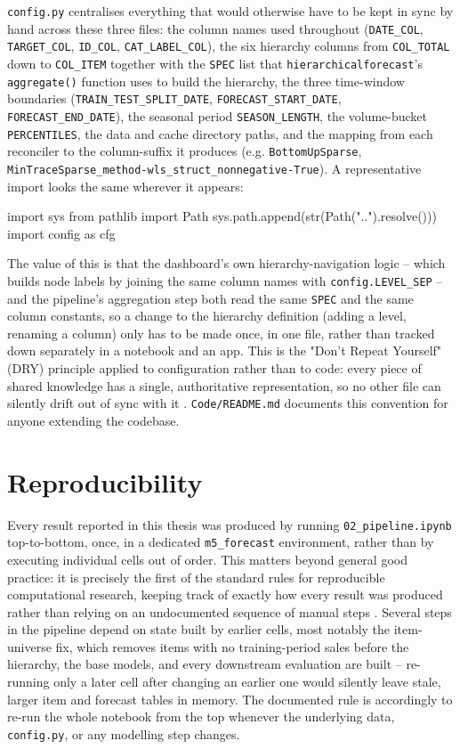 \texttt{config.py} centralises everything that would otherwise have to be kept in sync by hand across these three files: the column names used throughout (\texttt{DATE\_COL}, \texttt{TARGET\_COL}, \texttt{ID\_COL}, \texttt{CAT\_LABEL\_COL}), the six hierarchy columns from \texttt{COL\_TOTAL} down to \texttt{COL\_ITEM} together with the \texttt{SPEC} list that \texttt{hierarchicalforecast}'s \texttt{aggregate()} function uses to build the hierarchy, the three time-window boundaries (\texttt{TRAIN\_TEST\_SPLIT\_DATE}, \texttt{FORECAST\_START\_DATE}, \texttt{FORECAST\_END\_DATE}), the seasonal period \texttt{SEASON\_LENGTH}, the volume-bucket \texttt{PERCENTILES}, the data and cache directory paths, and the mapping from each reconciler to the column-suffix it produces (e.g. \texttt{BottomUpSparse}, \texttt{MinTraceSparse\_method-wls\_struct\_nonnegative-True}). A representative import looks the same wherever it appears:

\begin{Python}
	import sys
	from pathlib import Path
	sys.path.append(str(Path("..").resolve()))
	import config as cfg
\end{Python}

The value of this is that the dashboard's own hierarchy-navigation logic -- which builds node labels by joining the same column names with \texttt{config.LEVEL\_SEP} -- and the pipeline's aggregation step both read the same \texttt{SPEC} and the same column constants, so a change to the hierarchy definition (adding a level, renaming a column) only has to be made once, in one file, rather than tracked down separately in a notebook and an app. This is the "Don't Repeat Yourself" (DRY) principle applied to configuration rather than to code: every piece of shared knowledge has a single, authoritative representation, so no other file can silently drift out of sync with it \cite{Hunt:1999}. \texttt{Code/README.md} documents this convention for anyone extending the codebase.

\section{Reproducibility}
\label{sec:reproducibility}

Every result reported in this thesis was produced by running \texttt{02\_pipeline.ipynb} top-to-bottom, once, in a dedicated \texttt{m5\_forecast} environment, rather than by executing individual cells out of order. This matters beyond general good practice: it is precisely the first of the standard rules for reproducible computational research, keeping track of exactly how every result was produced rather than relying on an undocumented sequence of manual steps \cite{Sandve:2013}. Several steps in the pipeline depend on state built by earlier cells, most notably the item-universe fix, which removes items with no training-period sales before the hierarchy, the base models, and every downstream evaluation are built -- re-running only a later cell after changing an earlier one would silently leave stale, larger item and forecast tables in memory. The documented rule is accordingly to re-run the whole notebook from the top whenever the underlying data, \texttt{config.py}, or any modelling step changes.


